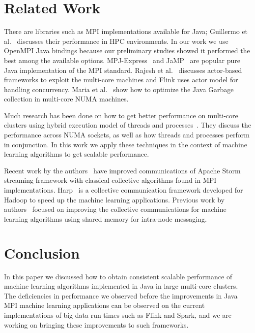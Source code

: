 \documentclass[10pt, conference, compsocconf]{IEEEtran}
\begin{document}
\section{Related Work} \label{sec:related}
There are libraries such as MPI implementations available for Java; Guillermo et al.~\cite{taboada2013java} discusses their performance in HPC environments. In our work we use OpenMPI Java bindings because our preliminary studies showed it performed the best among the available options. MPJ-Express~\cite{baker2006mpj} and JaMP~\cite{klemm2007jamp} are popular pure Java implementation of the MPI standard. Rajesh et al.~\cite{karmani2009actor} discusses actor-based frameworks to exploit the multi-core machines and Flink uses actor model for handling concurrency. Maria et al.~\cite{carpen2015performance} show how to optimize the Java Garbage collection in multi-core NUMA machines.

Much research has been done on how to get better performance on multi-core clusters using hybrid execution model of threads and processes~\cite{chorley2010performance, rabenseifner2009hybrid, camp2011streamline}. They discuss the performance across NUMA sockets, as well as how threads and processes perform in conjunction. In this work we apply these techniques in the context of machine learning algorithms to get scalable performance.

Recent work by the authors~\cite{kamburugamuve2016towards} have improved communications of Apache Storm streaming framework with classical collective algorithms found in MPI implementations. Harp~\cite{zhang2015harp} is a collective communication framework developed for Hadoop to speed up the machine learning applications. Previous work by authors~\cite{hpc2016:spidaljava} focused on improving the collective communications for machine learning algorithms using shared memory for intra-node messaging.

\section{Conclusion} \label{sec:conclusion \& Future Work}
In this paper we discussed how to obtain consistent scalable performance of machine learning algorithms implemented in Java in large multi-core clusters. The deficiencies in performance we observed before the improvements in Java MPI machine learning applications can be observed on the current implementations of big data run-times such as Flink and Spark, and we are working on bringing these improvements to such frameworks.
\end{document}
